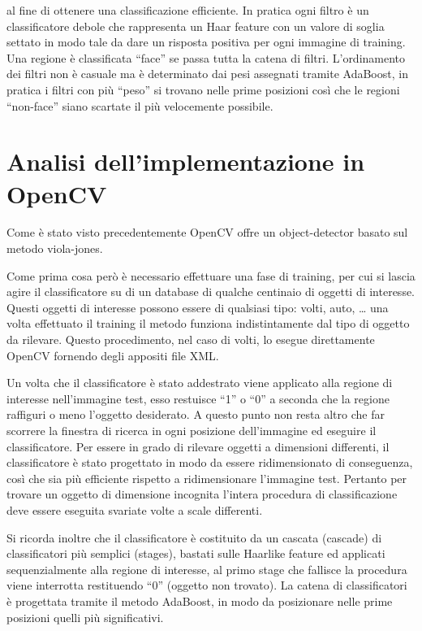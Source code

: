 \documentclass[a4paper,11pt]{article}
\newcommand{\cv}{OpenCV}
\begin{document}
al fine di ottenere una classificazione efficiente. In pratica ogni
filtro è un classificatore debole che rappresenta un Haar feature con
un valore di soglia settato in modo tale da dare un risposta positiva
per ogni immagine di training. Una regione è classificata ``face'' se
passa tutta la catena di filtri. L'ordinamento dei filtri non è
casuale ma è determinato dai pesi assegnati tramite AdaBoost, in
pratica i filtri con più ``peso'' si trovano nelle prime posizioni
così che le regioni ``non-face'' siano scartate il più velocemente
possibile.

\section{Analisi dell'implementazione in \cv{}}
\label{sec:imp}
Come è stato visto precedentemente \cv{} offre un object-detector
basato sul metodo viola-jones. 

Come prima cosa però è necessario effettuare una fase di training, per
cui si lascia agire il classificatore su di un database di qualche
centinaio di oggetti di interesse. Questi oggetti di interesse possono
essere di qualsiasi tipo: volti, auto, \ldots{} una volta effettuato il
training il metodo funziona indistintamente dal tipo di oggetto da
rilevare. Questo procedimento, nel caso di volti, lo esegue
direttamente \cv{} fornendo degli appositi file XML.

Un volta che il classificatore è stato addestrato viene applicato alla
regione di interesse nell'immagine test, esso restuisce ``1'' o ``0''
a seconda che la regione raffiguri o meno l'oggetto desiderato. A
questo punto non resta altro che far scorrere la finestra di ricerca
in ogni posizione dell'immagine ed eseguire il classificatore. Per
essere in grado di rilevare oggetti a dimensioni differenti, il
classificatore è stato progettato in modo da essere ridimensionato di
conseguenza, così che sia più efficiente rispetto a ridimensionare
l'immagine test. Pertanto per trovare un oggetto di dimensione
incognita l'intera procedura di classificazione deve essere eseguita
svariate volte a scale differenti.

Si ricorda inoltre che il classificatore è costituito da un cascata
(cascade) di classificatori più semplici (stages), bastati sulle
Haarlike feature ed applicati sequenzialmente alla regione di
interesse, al primo stage che fallisce la procedura viene interrotta
restituendo ``0'' (oggetto non trovato). La catena di classificatori è
progettata tramite il metodo AdaBoost, in modo da posizionare nelle
prime posizioni quelli più significativi.
\end{document}
